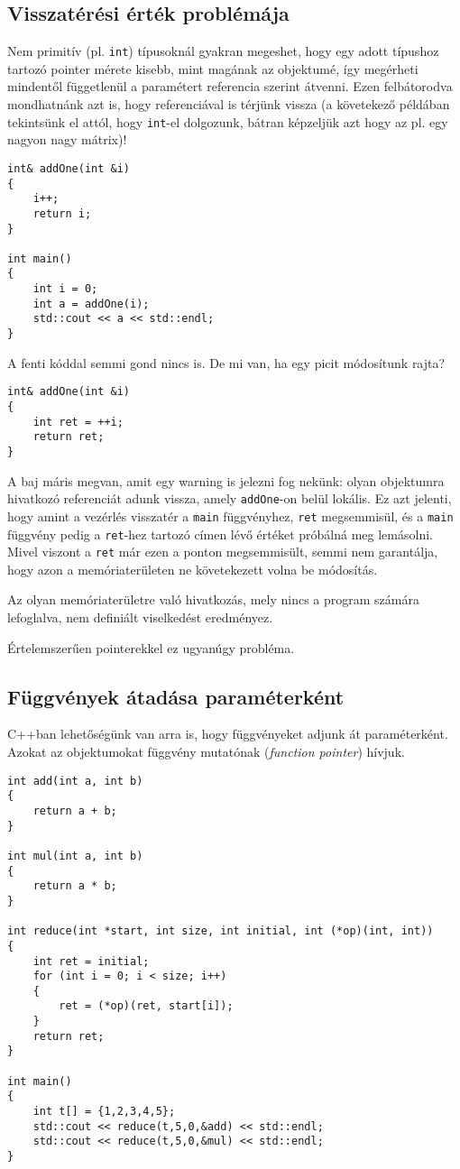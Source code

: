 \documentclass[a4paper,11.5pt,table]{article}
\begin{document}
	\subsection{Visszatérési érték problémája}
	Nem primitív (pl. \texttt{int}) típusoknál gyakran megeshet, hogy egy adott típushoz tartozó pointer mérete kisebb, mint magának az objektumé, így megérheti mindentől függetlenül a paramétert referencia szerint átvenni. Ezen felbátorodva mondhatnánk azt is, hogy referenciával is térjünk vissza (a követekező példában tekintsünk el attól, hogy \texttt{int}-el dolgozunk, bátran képzeljük azt hogy az pl. egy nagyon nagy mátrix)!
	\begin{lstlisting}
int& addOne(int &i)
{
	i++;
	return i;
}

int main()
{
	int i = 0;
	int a = addOne(i);
	std::cout << a << std::endl;
}
	\end{lstlisting}
	A fenti kóddal semmi gond nincs is. De mi van, ha egy picit módosítunk rajta?
	\begin{lstlisting}
int& addOne(int &i)
{
	int ret = ++i;
	return ret;
}
	\end{lstlisting}
	A baj máris megvan, amit egy warning is jelezni fog nekünk: olyan objektumra hivatkozó referenciát adunk vissza, amely \texttt{addOne}-on belül lokális. Ez azt jelenti, hogy amint a vezérlés visszatér a \texttt{main} függvényhez, \texttt{ret} megsemmisül, és a \texttt{main} függvény pedig a \texttt{ret}-hez tartozó címen lévő értéket próbálná meg lemásolni. Mivel viszont a \texttt{ret} már ezen a ponton megsemmisült, semmi nem garantálja, hogy azon a memóriaterületen ne követekezett volna be módosítás.
	
	\medskip
	Az olyan memóriaterületre való hivatkozás, mely nincs a program számára lefoglalva, nem definiált viselkedést eredményez.
	\begin{note}
		Értelemszerűen pointerekkel ez ugyanúgy probléma.
	\end{note}
	\subsection{Függvények átadása paraméterként}
	C++ban lehetőségünk van arra is, hogy függvényeket adjunk át paraméterként. Azokat az objektumokat függvény mutatónak (\textit{function pointer}) hívjuk.
	\begin{lstlisting}
int add(int a, int b)
{
	return a + b;
}

int mul(int a, int b)
{
	return a * b;
}

int reduce(int *start, int size, int initial, int (*op)(int, int))
{
	int ret = initial;
	for (int i = 0; i < size; i++)
	{
		ret = (*op)(ret, start[i]);
	}
	return ret;
}

int main()
{
	int t[] = {1,2,3,4,5};
	std::cout << reduce(t,5,0,&add) << std::endl;
	std::cout << reduce(t,5,0,&mul) << std::endl;
}
	\end{lstlisting}
	
\end{document}
